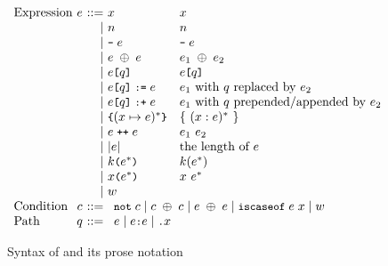 \begin{figure}[t]
\[\begin{array}{l@{~}c@{~}r@{~}lll}
\text{Expression} & \expr &::=&
    \varx & \varx\\
&& \mid&
  \num & \num\\
&& \mid&
  \bcode{-} \; \expr & \bcode{-} \; \expr\\
&& \mid&
  \expr \; \binop \; \expr & \expr_1 \; \binop \; \expr_2\\
&& \mid&
  \expr \kwsl \qual \kwsr & \expr \kwsl \qual \kwsr\\
&& \mid&
  \expr \kwsl \qual \kwsr \; \kwass \; \expr & \mbox{$\expr_1$ with $\qual$ replaced by $\expr_2$}\\
&& \mid&
  \expr \kwsl \qual \kwsr \; \kwext \; \expr & \mbox{$\expr_1$ with $\qual$ prepended/appended by $\expr_2$}\\
&& \mid&
  \kwcl (\varx \mapsto \expr)^* \kwcr & \{\ (\varx:\expr)^*\ \}\\
&& \mid&
  \expr \; \kwcat \; \expr & \expr_1~\expr_2\\
&& \mid&
  | \expr | & \mbox{the length of $\expr$}\\
&&\mid&
  \cnstr \kwrl \expr^* \kwrr & \cnstr(\expr^*)\\
&& \mid&
  \varx \kwrl \expr^* \kwrr & \varx~\expr^*\\
&& \mid&
    \wasmc \\

\text{Condition} & \cond &::=&
\multicolumn{2}{l}{
    \kwnot \; \cond \mid
    \cond \; \binop \; \cond \mid
    \expr \; \binop \; \expr \mid
    \kwiscaseof \; \expr \; \varx \mid
    \wasmc
}
\\

\text{Path} & \qual &::=&
\multicolumn{2}{l}{
    \expr \mid
    \expr \bcode{:} \expr \mid
    \bcode{.} x
}
\\
  \end{array}
\]
\vspace*{-1em}
\caption{Syntax of \al and its prose notation}\label{fig:al-syntax}
\end{figure}

